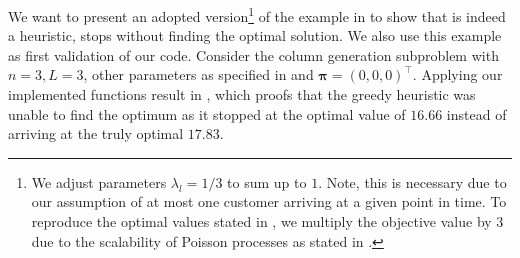 We want to present an adopted version\footnote{We adjust parameters $\lambda_l = 1/3$ to sum up to $1$. Note, this is necessary due to our assumption of at most one customer arriving at a given point in time. To reproduce the optimal values stated in \cite{Bront.2009}, we multiply the objective value by $3$ due to the scalability of Poisson processes as stated in .} of the example in \cite{Bront.2009} to show that  is indeed a heuristic, \ie stops without finding the optimal solution. We also use this example as first validation of our code. Consider the column generation subproblem  with $n=3, L=3$, other parameters as specified in  and $\boldsymbol{\pi} = (0, 0, 0)^\intercal$. Applying our implemented functions result in , which proofs that the greedy heuristic was unable to find the optimum as it stopped at the optimal value of $16.66$ instead of arriving at the truly optimal $17.83$.

